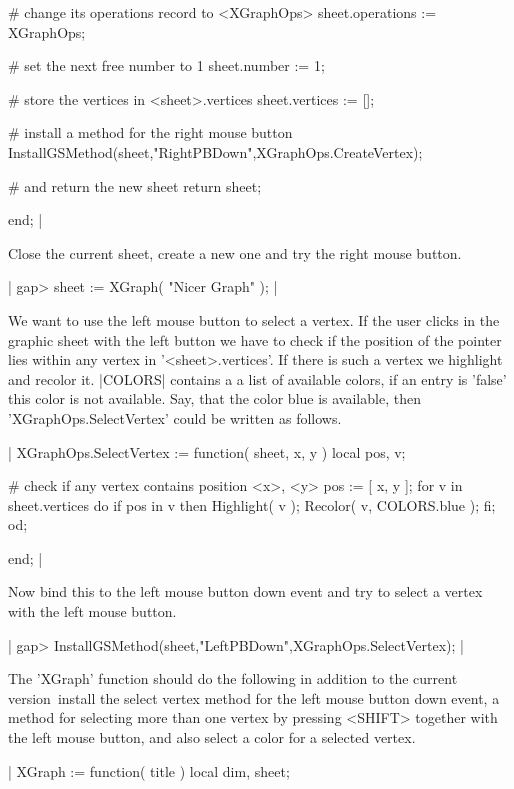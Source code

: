         # change its operations record to <XGraphOps>
        sheet.operations := XGraphOps;

        # set the next free number to 1
        sheet.number := 1;

        # store the vertices in <sheet>.vertices
        sheet.vertices := [];
        
        # install a method for the right mouse button
        InstallGSMethod(sheet,"RightPBDown",XGraphOps.CreateVertex);

        # and return the new sheet
        return sheet;

    end; |

Close the current sheet, create a new one and try the right mouse button.

|    gap> sheet := XGraph( "Nicer Graph" ); |

We  want to use  the left mouse button  to select a  vertex.  If the user
clicks in the graphic sheet with the left button  we have to check if the
position of the pointer lies within any vertex in '<sheet>.vertices'.  If
there is such a vertex we highlight and recolor  it.  |COLORS| contains a
a list  of available colors,  if an  entry  is 'false'  this color is not
available.   Say,   that    the   color    blue   is   available,    then
'XGraphOps.SelectVertex' could be written as follows.

|    XGraphOps.SelectVertex := function( sheet, x, y )
        local   pos,  v;

        # check if any vertex contains position <x>, <y>
        pos := [ x, y ];
        for v  in sheet.vertices  do
            if pos in v  then
                Highlight( v );
                Recolor( v, COLORS.blue );
            fi;
        od;

    end; |

Now  bind this to the  left mouse button down event  and  try to select a
vertex with the left mouse button.

|    gap> InstallGSMethod(sheet,"LeftPBDown",XGraphOps.SelectVertex); |

The 'XGraph' function should do the  following in addition to the current
version\:\ install the  select  vertex method for  the left  mouse button
down   event, a method for   selecting more than  one  vertex by pressing
<SHIFT> together with the left mouse button,  and also select a color for
a selected vertex.

|    XGraph := function( title )
        local   dim,  sheet;

